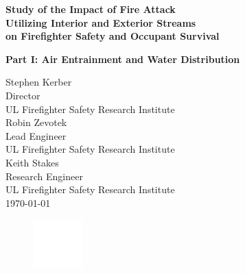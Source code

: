 \documentclass{article}
\begin{document}
\begin{titlepage}
		\huge
		\begin{adjustwidth}{-0.5in}{-0in}
		\color{white}
		\textbf{Study of the Impact of Fire Attack \\ Utilizing Interior and Exterior Streams \\ on Firefighter Safety and Occupant Survival}
		\end{adjustwidth}
		\huge
		\begin{adjustwidth}{-0.5in}{-0in}
		\color{white}
		\textbf{Part I: Air Entrainment and Water Distribution}
		\end{adjustwidth}
		\begin{adjustwidth}{-0.5in}{}
		\color{white}
		\vspace{.2\baselineskip}
		\large
		Stephen Kerber \\
		Director \\
		UL Firefighter Safety Research Institute \\
		\vspace*{.5\baselineskip}
		Robin Zevotek \\
		Lead Engineer \\
		UL Firefighter Safety Research Institute \\ 
		\vspace*{.5\baselineskip}
		Keith Stakes \\
		Research Engineer \\
		UL Firefighter Safety Research Institute \\
		\vspace*{.8\baselineskip}	
		\today
		\vspace*{.8\baselineskip}
		\begin{figure}[h]
			\hspace*{-0.5in}\includegraphics[width=0.75in]{../0_Images/ULLogoWhite.pdf}
		\end{figure}
		\end{adjustwidth}
	\end{titlepage}
\end{document}

